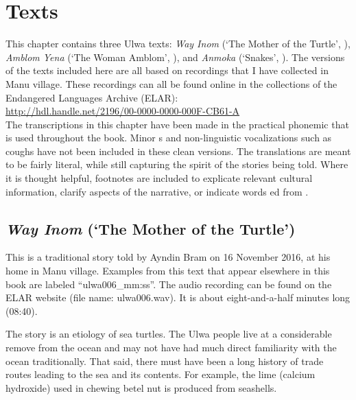 \chapter{Texts}\label{sec:16}

This chapter contains three Ulwa texts: \textit{Way Inom} (‘The Mother of the Turtle’, ), \textit{Amblom Yena} (‘The Woman Amblom’, ), and \textit{Anmoka} (‘Snakes’, ). The versions of the texts included here are all based on recordings that I have collected in Manu village. These recordings can all be found online in the collections of the Endangered Languages Archive (ELAR):\\

\url{http://hdl.handle.net/2196/00-0000-0000-000F-CB61-A}\\

The transcriptions in this chapter have been made in the practical phonemic  that is used throughout the book. Minor s and non-linguistic vocalizations such as coughs have not been included in these clean versions. The translations are meant to be fairly literal, while still capturing the spirit of the stories being told. Where it is thought helpful, footnotes are included to explicate relevant cultural information, clarify aspects of the narrative, or indicate words ed from .

\section{\label{sec:16.1}  {\textit{Way Inom}} {(‘The} {Mother} {of} {the} {Turtle’)}}

This is a traditional story told by Ayndin Bram on 16  {November 2016}, at his home in Manu village. Examples from this text that appear elsewhere in this book are labeled “ulwa006\_mm:ss”. The audio recording can be found on the ELAR website (file name: ulwa006.wav). It is about eight-and-a-half minutes long (08:40).

  The story is an etiology of sea turtles. The Ulwa people live at a considerable remove from the ocean and may not have had much direct familiarity with the ocean traditionally. That said, there must have been a long history of trade routes leading to the sea and its contents. For example, the lime (calcium hydroxide) used in chewing betel nut is produced from seashells.

